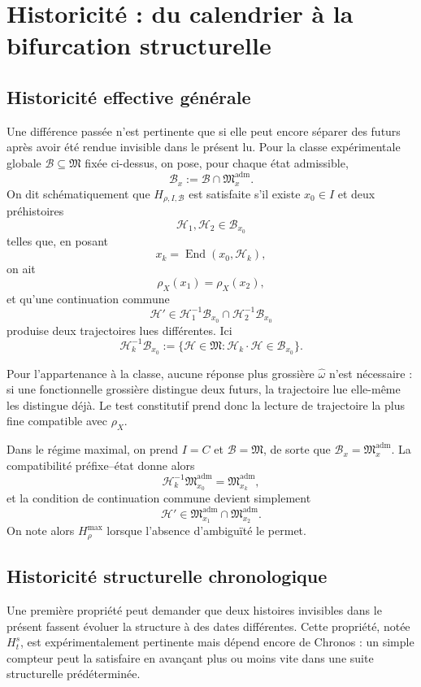 \documentclass[11pt,a4paper]{article}
\theoremstyle{definition}
\theoremstyle{remark}
\newcommand{\M}{\mathfrak M}
\newcommand{\Madm}{\mathfrak M^{\mathrm{adm}}}
\newcommand{\End}{\operatorname{End}}
\begin{document}
\section{Historicité : du calendrier à la bifurcation structurelle}

\subsection{Historicité effective générale}

Une différence passée n'est pertinente que si elle peut encore séparer des futurs après avoir été rendue invisible dans le présent lu. Pour la classe expérimentale globale $\mathcal B\subseteq\M$ fixée ci-dessus, on pose, pour chaque état admissible,
\[
\boxed{\mathcal B_x:=\mathcal B\cap\Madm_x.}
\]
On dit schématiquement que $H_{\rho,I,\mathcal B}$ est satisfaite s'il existe $x_0\in I$ et deux préhistoires
\[
\mathcal H_1,\mathcal H_2\in\mathcal B_{x_0}
\]
telles que, en posant
\[
x_k=\End(x_0,\mathcal H_k),
\]
on ait
\[
\rho_X(x_1)=\rho_X(x_2),
\]
et qu'une continuation commune
\[
\boxed{
\mathcal H'\in
\mathcal H_1^{-1}\mathcal B_{x_0}\cap
\mathcal H_2^{-1}\mathcal B_{x_0}}
\]
produise deux trajectoires lues différentes. Ici
\[
\mathcal H_k^{-1}\mathcal B_{x_0}
:=\{\mathcal H\in\M:\mathcal H_k\cdot\mathcal H\in\mathcal B_{x_0}\}.
\]

Pour l'appartenance à la classe, aucune réponse plus grossière $\widehat\omega$ n'est nécessaire : si une fonctionnelle grossière distingue deux futurs, la trajectoire lue elle-même les distingue déjà. Le test constitutif prend donc la lecture de trajectoire la plus fine compatible avec $\rho_X$.

Dans le régime maximal, on prend $I=C$ et $\mathcal B=\M$, de sorte que $\mathcal B_x=\Madm_x$. La compatibilité préfixe--état donne alors
\[
\mathcal H_k^{-1}\Madm_{x_0}=\Madm_{x_k},
\]
et la condition de continuation commune devient simplement
\[
\boxed{\mathcal H'\in\Madm_{x_1}\cap\Madm_{x_2}.}
\]
On note alors $H_\rho^{\max}$ lorsque l'absence d'ambiguïté le permet.

\subsection{Historicité structurelle chronologique}

Une première propriété peut demander que deux histoires invisibles dans le présent fassent évoluer la structure à des dates différentes. Cette propriété, notée $H_t^s$, est expérimentalement pertinente mais dépend encore de Chronos : un simple compteur peut la satisfaire en avançant plus ou moins vite dans une suite structurelle prédéterminée.
\end{document}
